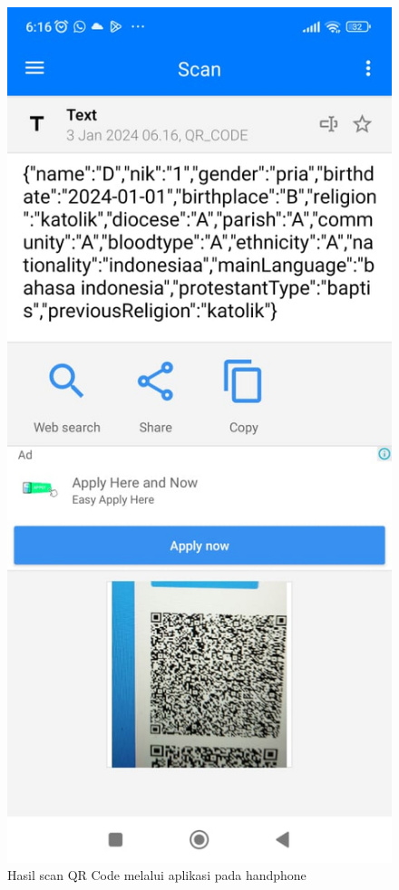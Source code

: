 \begin{figure}[H]
	\centering
	\includegraphics[scale=0.4]{Gambar/hasilScanBest.jpg}
	\caption{Hasil scan QR Code melalui aplikasi pada handphone} 
	\label{fig:hasilScanBest}
\end{figure}

